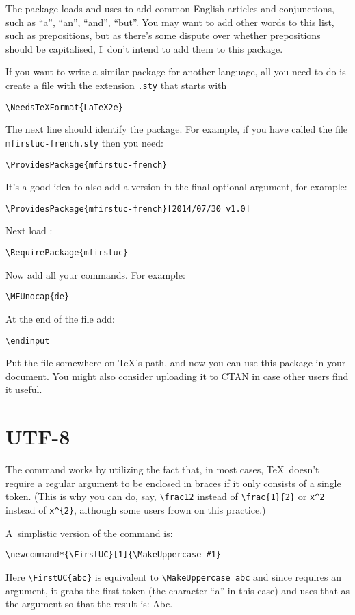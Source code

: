 \documentclass{nlctdoc}
\begin{document}
The package  loads  and uses
 to add common English articles and conjunctions, such
as ``a'', ``an'', ``and'', ``but''. You may want to add other
words to this list, such as prepositions, but as there's some
dispute over whether prepositions should be capitalised, I~don't
intend to add them to this package.

If you want to write a similar package for another language, all you
need to do is create a file with the extension \texttt{.sty}
that starts with
\begin{verbatim}
\NeedsTeXFormat{LaTeX2e}
\end{verbatim}
The next line should identify the package. For example, if you have
called the file \texttt{mfirstuc-french.sty} then you need:
\begin{verbatim}
\ProvidesPackage{mfirstuc-french}
\end{verbatim}
It's a good idea to also add a version in the final optional
argument, for example:
\begin{verbatim}
\ProvidesPackage{mfirstuc-french}[2014/07/30 v1.0]
\end{verbatim}
Next load :
\begin{verbatim}
\RequirePackage{mfirstuc}
\end{verbatim}
Now add all your  commands. For example:
\begin{verbatim}
\MFUnocap{de}
\end{verbatim}
At the end of the file add:
\begin{verbatim}
\endinput
\end{verbatim}

Put the file somewhere on \TeX's path, and now you can use this
package in your document. You might also consider uploading it
to CTAN in case other users find it useful.

\section{UTF-8}
\label{sec:utf8}

The  command works by utilizing the fact that, in
most cases, \TeX\ doesn't require a regular argument to be enclosed
in braces if it only consists of a single token. (This is why you
can do, say, \verb|\frac12| instead of \verb|\frac{1}{2}| or
\verb|x^2| instead of \verb|x^{2}|, although some users
frown on this practice.)

A~simplistic version of the  command is:
\begin{verbatim}
\newcommand*{\FirstUC}[1]{\MakeUppercase #1}
\end{verbatim}
Here \verb|\FirstUC{abc}| is equivalent to \verb|\MakeUppercase abc|
and since  requires an argument, it grabs the
first token (the character ``a'' in this case) and uses that as the
argument so that the result is: Abc.
\end{document}
